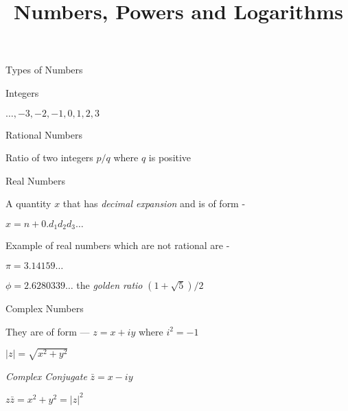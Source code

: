 \documentclass{slides}
\title{Numbers, Powers and Logarithms}
\begin{document}
\maketitle
\begin{slide}
  \begin{center}
    Types of Numbers
  \end{center}  
    Integers

    $ \ldots , -3 , -2, -1, 0, 1, 2, 3 $
    
    Rational Numbers
    
    \normalsize Ratio of two integers $p/q$ where $q$ is positive 

    Real Numbers

    A quantity $x$ that has {\it decimal expansion} and is of form -

    $ x = n + 0.d_{1}d_{2}d_{3}\ldots $

    Example of real numbers which are not rational are -

    $\pi = 3.14159\ldots $
    
    $\phi = 2.6280339\ldots $ the {\it golden ratio } $ (1+\sqrt{5})/2$

    Complex Numbers
    
    They are of form --- $z = x + iy$ where $ i^2 = -1 $

    $ \left|z\right| = \sqrt{x^2 + y^2}$

    {\it Complex Conjugate} $ \bar{z} = x - iy $

    $z\bar{z} = x^2 + y^2 = \left|z\right|^2  $

    
\end{slide}
\end{document}
